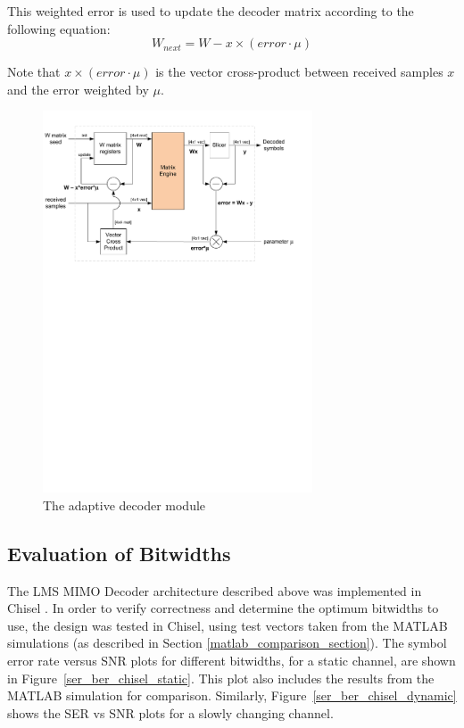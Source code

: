 \documentclass[journal]{IEEEtran}
\begin{document}
This weighted error is used to update the decoder matrix according to the following equation:
\[ W_{next} = W - x \times (error \cdot \mu) \]

Note that $x \times (error \cdot \mu)$ is the vector cross-product between received samples $x$ and the error weighted by $\mu$.
\begin{figure}[!h]
\centering
\includegraphics*[width=8cm, viewport = 0 510 560 810]{images/adaptive_decoder.pdf}
\caption{The adaptive decoder module}
\label{adaptive_decoder}
\end{figure}

\subsection{Evaluation of Bitwidths}

The LMS MIMO Decoder architecture described above was implemented in Chisel \cite{chisel}. In order to verify correctness and determine the optimum bitwidths to use, the design was tested in Chisel, using test vectors taken from the MATLAB simulations (as described in Section \ref{matlab_comparison_section}). The symbol error rate versus SNR plots for different bitwidths, for a static channel, are shown in Figure~\ref{ser_ber_chisel_static}. This plot also includes the results from the MATLAB simulation for comparison. Similarly, Figure~\ref{ser_ber_chisel_dynamic} shows the SER vs SNR plots for a slowly changing channel.
\end{document}
